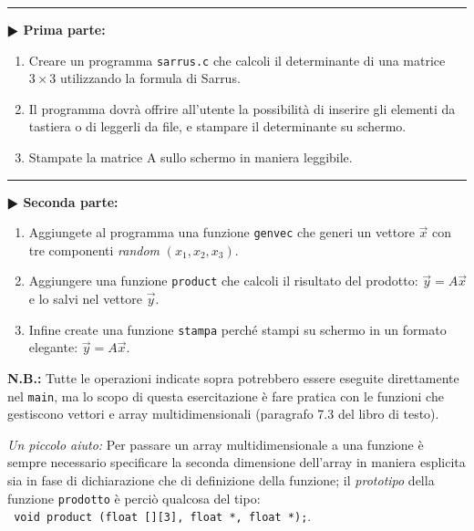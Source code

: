 \documentclass[11pt]{article}
\begin{document}
\vspace{2mm}
\hrule
\vspace{2mm}
\textbf{$\RHD$ Prima parte:}

\begin{enumerate}
\item Creare un programma \texttt{sarrus.c} che calcoli il determinante di una matrice $3 \times 3$ 
utilizzando la formula di Sarrus.
\item Il programma dovrà offrire all'utente la possibilità di inserire gli elementi da tastiera 
o di leggerli da file, e stampare il determinante su schermo.
\item Stampate la matrice A sullo schermo in maniera leggibile.
\end{enumerate}

\hrule
\vspace{2mm}
\textbf{$\RHD$ Seconda parte:}
\vspace{2mm}
\begin{enumerate}
\item
Aggiungete al programma una funzione \texttt{genvec} che generi un vettore $\vec{x}$ con tre componenti {\em random} 
$\left(x_1,x_2,x_3\right)$.
\item Aggiungere una funzione \texttt{product} che calcoli il risultato del prodotto: 
$\vec{y}=A \vec{x}$ e lo salvi nel vettore $\vec{y}$.
\item Infine create una funzione \texttt{stampa}  perché stampi su schermo in un formato elegante:
$\vec{y}=A \vec{x}$.
\end{enumerate}
{\bf N.B.:} Tutte le operazioni indicate sopra potrebbero essere eseguite direttamente nel \texttt{main}, ma lo scopo
di questa esercitazione è fare pratica con le funzioni che gestiscono vettori e array multidimensionali (paragrafo 7.3
del libro di testo). 
\\
\begin{mdframed}[backgroundcolor=gray!10]
{\em Un piccolo aiuto:} Per passare un array multidimensionale a una funzione è sempre necessario specificare la seconda  dimensione dell'array in maniera esplicita sia in fase di dichiarazione che di definizione della funzione;
il {\em prototipo} della funzione \texttt{prodotto} è perciò qualcosa del tipo:
\\
\texttt{
void product (float [][3], float *, float *);}.
\end{mdframed}
\end{document}
